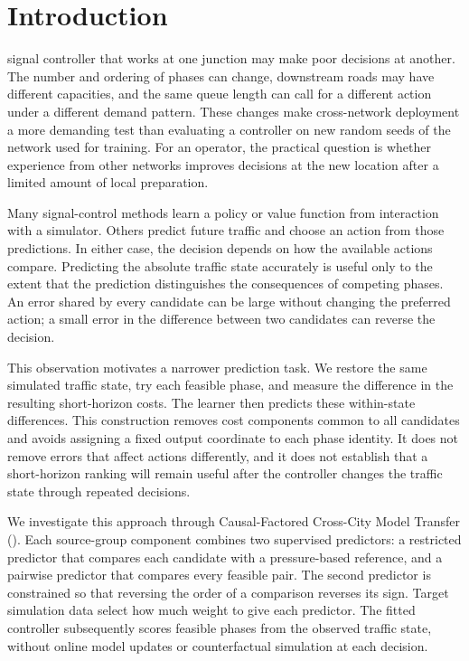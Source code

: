 \section{Introduction}
 signal controller that works at one junction may make poor decisions at another. The number and ordering of phases can change, downstream roads may have different capacities, and the same queue length can call for a different action under a different demand pattern. These changes make cross-network deployment a more demanding test than evaluating a controller on new random seeds of the network used for training. For an operator, the practical question is whether experience from other networks improves decisions at the new location after a limited amount of local preparation.

Many signal-control methods learn a policy or value function from interaction with a simulator. Others predict future traffic and choose an action from those predictions. In either case, the decision depends on how the available actions compare. Predicting the absolute traffic state accurately is useful only to the extent that the prediction distinguishes the consequences of competing phases. An error shared by every candidate can be large without changing the preferred action; a small error in the difference between two candidates can reverse the decision.

This observation motivates a narrower prediction task. We restore the same simulated traffic state, try each feasible phase, and measure the difference in the resulting short-horizon costs. The learner then predicts these within-state differences. This construction removes cost components common to all candidates and avoids assigning a fixed output coordinate to each phase identity. It does not remove errors that affect actions differently, and it does not establish that a short-horizon ranking will remain useful after the controller changes the traffic state through repeated decisions.

We investigate this approach through Causal-Factored Cross-City Model Transfer (\method). Each source-group component combines two supervised predictors: a restricted predictor that compares each candidate with a pressure-based reference, and a pairwise predictor that compares every feasible pair. The second predictor is constrained so that reversing the order of a comparison reverses its sign. Target simulation data select how much weight to give each predictor. The fitted controller subsequently scores feasible phases from the observed traffic state, without online model updates or counterfactual simulation at each decision.

